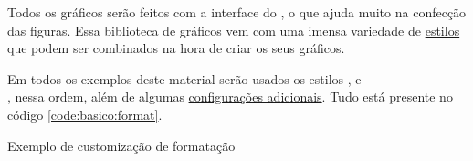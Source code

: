 Todos os gráficos serão feitos com a interface \pyplot do \matplotlib, o que ajuda muito na confecção das figuras. Essa biblioteca de gráficos vem com uma imensa variedade de \href{https://matplotlib.org/3.1.0/gallery/style_sheets/style_sheets_reference.html}{estilos} que podem ser combinados na hora de criar os seus gráficos.

Em todos os exemplos deste material serão usados os estilos ,  e \\, nessa ordem, além de algumas \href{https://matplotlib.org/users/customizing.html}{configurações adicionais}. Tudo está presente no código \ref{code:basico:format}.

\begin{listing}[H]
    \caption{Exemplo de customização de formatação}
    \label{code:basico:format}

\end{listing}
